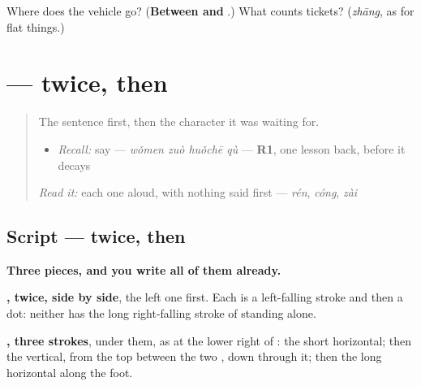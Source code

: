 \begin{tcolorbox}[breakable,colback=teal!4,colframe=teal!35!black,title={Before you move on}]
Where does the vehicle go? (\textbf{Between  and }.) What counts tickets? (\emph{zhāng}, as for flat things.)
\end{tcolorbox}
\section[\texorpdfstring{\zh{坐} (zuò)}{坐 (zuò)}]{ —  twice, then }

\label{lesson:ZH-W284-zuo}



\begin{quote}
The sentence first, then the character it was waiting for.

\begin{itemize}
\raggedright
  \item \emph{Recall:} say  — \emph{wǒmen zuò huǒchē qù} — \textbf{R1}, one lesson back, before it decays
\end{itemize}

\begin{quote}
  
\end{quote}

\emph{Read it:} each one aloud, with nothing said first — \emph{rén}, \emph{cóng}, \emph{zài}
\end{quote}

\subsection*{Script —  twice, then }

\begin{quote}
\end{quote}

\textbf{Three pieces, and you write all of them already.}

\textbf{, twice, side by side}, the left one first. Each is a left-falling stroke and then a dot: neither has the long right-falling stroke of  standing alone.

\textbf{, three strokes}, under them, as at the lower right of : the short horizontal; then the vertical, from the top between the two , down through it; then the long horizontal along the foot.

